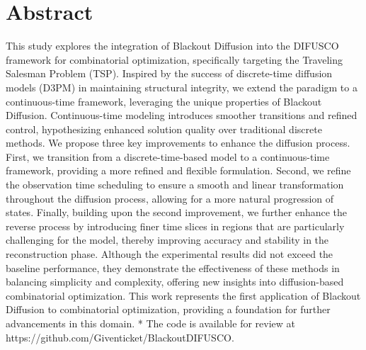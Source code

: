 \section*{Abstract}
This study explores the integration of Blackout Diffusion into the DIFUSCO framework for combinatorial optimization, specifically targeting the Traveling Salesman Problem (TSP). Inspired by the success of discrete-time diffusion models (D3PM) in maintaining structural integrity, we extend the paradigm to a continuous-time framework, leveraging the unique properties of Blackout Diffusion. Continuous-time modeling introduces smoother transitions and refined control, hypothesizing enhanced solution quality over traditional discrete methods. We propose three key improvements to enhance the diffusion process. First, we transition from a discrete-time-based model to a continuous-time framework, providing a more refined and flexible formulation. Second, we refine the observation time scheduling to ensure a smooth and linear transformation throughout the diffusion process, allowing for a more natural progression of states. Finally, building upon the second improvement, we further enhance the reverse process by introducing finer time slices in regions that are particularly challenging for the model, thereby improving accuracy and stability in the reconstruction phase. Although the experimental results did not exceed the baseline performance, they demonstrate the effectiveness of these methods in balancing simplicity and complexity, offering new insights into diffusion-based combinatorial optimization. This work represents the first application of Blackout Diffusion to combinatorial optimization, providing a foundation for further advancements in this domain. * The code is available for review at https://github.com/Giventicket/BlackoutDIFUSCO.